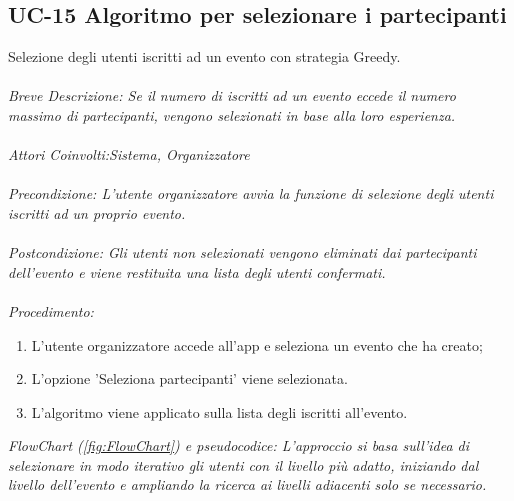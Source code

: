 \subsection{UC-15 Algoritmo per selezionare i partecipanti}
Selezione degli utenti iscritti ad un evento con strategia Greedy.
\\
\\
\textit{Breve Descrizione: Se il numero di iscritti ad un evento eccede il numero massimo di partecipanti, vengono selezionati in base alla loro esperienza.} 
\\
\\
\textit{Attori Coinvolti:Sistema, Organizzatore}
\\
\\
\textit{Precondizione: L'utente organizzatore avvia la funzione di selezione degli utenti iscritti ad un proprio evento.}
\\
\\
\textit{Postcondizione: Gli utenti non selezionati vengono eliminati dai partecipanti dell'evento e viene restituita una lista degli utenti confermati.}
\\
\\
\textit{Procedimento:}
\begin{enumerate}
	\item L'utente organizzatore accede all'app e seleziona un evento che ha creato;
 	\item L'opzione 'Seleziona partecipanti' viene selezionata.
	\item L'algoritmo viene applicato sulla lista degli iscritti all'evento.
\end{enumerate}
\newpage
\textit{FlowChart (\ref*{fig:FlowChart}) e pseudocodice: L'approccio si basa sull'idea di selezionare in modo iterativo gli utenti con il livello più
adatto, iniziando dal livello dell'evento e ampliando la ricerca ai livelli adiacenti solo se
necessario.}


